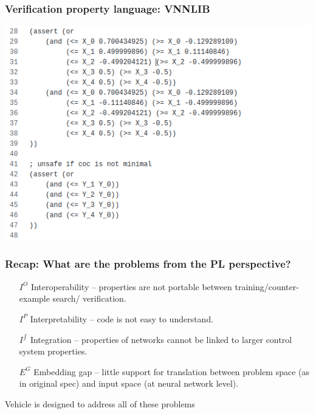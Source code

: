 \documentclass[t,compress,aspectratio=169]{beamer}
\begin{document}
\begin{frame}
\frametitle{Verification property language: VNNLIB}
\includegraphics[width=0.7\linewidth]{img/vnnlib.png}
\end{frame}




\begin{frame}
\frametitle{Recap: What are the problems from the PL perspective?}

\pause
\begin{itemize}
\item[$I^O$] Interoperability -- properties are not portable between training/counter-example search/ verification.
\pause
\item[$I^{P}$] Interpretability -- code is not easy to understand.
\pause
\item[$I^{\int}$] Integration -- properties of networks cannot be linked to larger control system properties.
\pause
\item[$E^G$] Embedding gap -- little support for translation between problem space (as in original spec) and input space (at neural network level).
\end{itemize}

\alert{Vehicle is designed to address all of these problems}

\end{frame}
\end{document}
